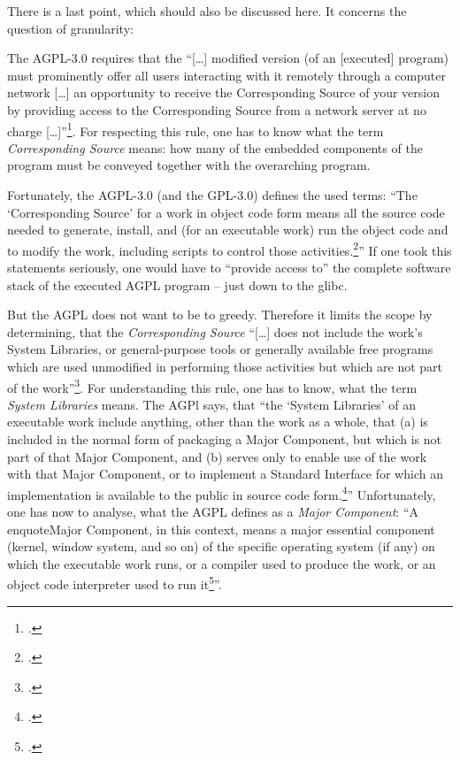There is a last point, which should also be discussed here. It concerns the
question of granularity:

The AGPL-3.0 requires that the \enquote{[\ldots] modified version (of an
[executed] program) must prominently offer all users interacting with it remotely through a
computer network [\ldots] an opportunity to receive the Corresponding Source of
your version by providing access to the Corresponding Source from a network
server at no charge [\ldots]}\footcite[cf.][\nopage wp.
§13]{Agpl30OsiLicense2007a}. For respecting this rule, one has to know what the
term \emph{Corresponding Source} means: how many of the embedded components of the
program must be conveyed together with the overarching program.

Fortunately, the AGPL-3.0 (and the GPL-3.0) defines the used terms: \enquote{The
\enquote{Corresponding Source} for a work in object code form means all the
source code needed to generate, install, and (for an executable work) run the
object code and to modify the work, including scripts to control those
activities.\footcite[cf.][\nopage wp. §1]{Agpl30OsiLicense2007a}} If one took
this statements seriously, one would have to \enquote{provide access to} the
complete software stack of the executed AGPL program -- just down to the glibc.

But the AGPL does not want to be to greedy. Therefore it limits the scope by
determining, that the \emph{Corresponding Source} \enquote{[\ldots] does not
include the work's System Libraries, or general-purpose tools or generally
available free programs which are used unmodified in performing those activities
but which are not part of the work}\footcite[cf.][\nopage wp.
§1]{Agpl30OsiLicense2007a}. For understanding this rule, one has to know, what
the term \emph{System Libraries} means. The AGPl says, that \enquote{the
\enquote{System Libraries} of an executable work include anything, other than
the work as a whole, that (a) is included in the normal form of packaging a
Major Component, but which is not part of that Major Component, and (b) serves
only to enable use of the work with that Major Component, or to implement a
Standard Interface for which an implementation is available to the public in
source code form.\footcite[cf.][\nopage wp. §1]{Agpl30OsiLicense2007a}}
Unfortunately, one has now to analyse, what the AGPL defines as a \emph{Major
Component}: \enquote{A enquote{Major Component}, in this context, means a major
essential component (kernel, window system, and so on) of the specific operating
system (if any) on which the executable work runs, or a compiler used to produce
the work, or an object code interpreter used to run it\footcite[cf.][\nopage wp.
§1]{Agpl30OsiLicense2007a}}.

